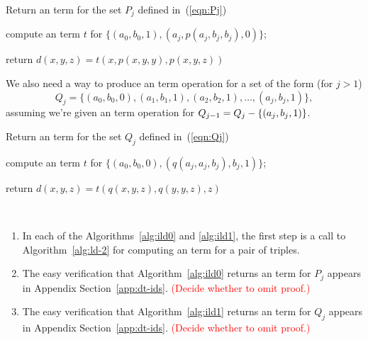 \LinesNumbered
\begin{algorithm}%

\caption{Return an \ld term for the set $P_j$ defined in~(\ref{eqn:Pj})
\label{alg:ild0}}  

compute an \ld term $t$ for $\{(a_0, b_0, 1), (a_j, p(a_j, b_j, b_j), 0)\}$;

return $d(x,y,z) = t(x, p(x,y,y), p(x,y,z))$

\end{algorithm}


We also need a way to produce an \ld
term operation for a set of the form  (for $j>1$)
\begin{equation}
\label{eqn:Qj}
Q_{j} = \{(a_0, b_0, 0), (a_1, b_1, 1), (a_2, b_2, 1), \dots, 
(a_{j}, b_{j}, 1)\},
\end{equation}
assuming we're given an \ld term operation for 
$Q_{j-1} = Q_j - \{(a_j, b_j, 1)\}$.  

\LinesNumbered
\begin{algorithm}%
  \caption{Return an \ld term for the set $Q_j$ defined in~(\ref{eqn:Qj})
  \label{alg:ild1}}  

  compute an \ld term $t$ for $\{(a_0, b_0, 0), (q(a_j, a_j, b_j), b_j, 1)\}$;

  return $d(x,y,z) = t(q(x,y,z), q(y,y,z), z)$
\end{algorithm}

\begin{remarks}\
\begin{enumerate}[1.] 
\item In each of the Algorithms~\ref{alg:ild0} and \ref{alg:ild1},
the first step is a call to Algorithm~\ref{alg:ld-2} 
for computing an \ld term for a pair of triples.
\item The easy verification that Algorithm~\ref{alg:ild0} returns
an \ld term for $P_j$ appears in Appendix Section~\ref{app:dt-ids}. 
\textcolor{red}{(Decide whether to omit proof.)}
\item The easy verification that Algorithm~\ref{alg:ild1} returns
an \ld term for $Q_j$ appears in Appendix Section~\ref{app:dt-ids}. 
\textcolor{red}{(Decide whether to omit proof.)}
\end{enumerate}
\end{remarks}


